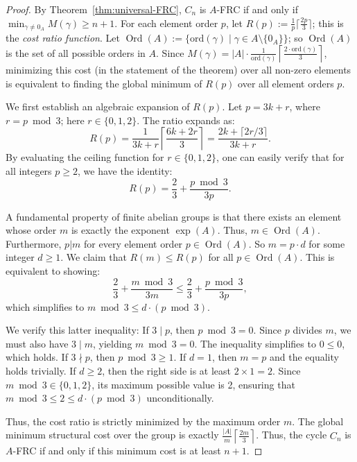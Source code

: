 \documentclass[a4paper,12pt]{article}
\theoremstyle{plain}
\theoremstyle{definition}
\renewcommand\le\leqslant
\renewcommand\ge\geqslant
\newcommand\ord{\textrm{ord}}
\begin{document}
\begin{proof}
By Theorem~\ref{thm:universal-FRC}, $C_n$ is $A$-FRC if and only if $\min_{\gamma \neq 0_A} M(\gamma) \ge n+1$. 
For each element order $p$, let $R(p):= \frac{1}{p}\lceil \frac{2p}{3} \rceil$; this is the
\emph{cost ratio function}.
Let $\operatorname{Ord}(A) := \{ \ord(\gamma) \mid \gamma \in A \setminus \{0_A\} \}$; so $\operatorname{Ord}(A)$ is the set of all possible orders in $A$.
Since $M(\gamma) = |A| \cdot \frac{1}{\ord(\gamma)}\left\lceil \frac{2\cdot \ord(\gamma)}{3} \right\rceil$, minimizing this cost (in the statement of the theorem) over all non-zero elements is equivalent to finding the global minimum of $R(p)$
over all element orders $p$. 

We first establish an algebraic expansion of $R(p)$. Let $p = 3k + r$, where $r = p \bmod 3$; here $r \in \{0, 1, 2\}$. 
The ratio expands as:
\[ R(p) = \frac{1}{3k+r} \left\lceil \frac{6k+2r}{3} \right\rceil = \frac{2k + \lceil 2r/3 \rceil}{3k+r}. \]
By evaluating the ceiling function for $r \in \{0, 1, 2\}$, one can easily verify that for all integers $p \ge 2$, we have the identity:
\[ R(p) = \frac{2}{3} + \frac{p \bmod 3}{3p}. \]

A fundamental property of finite abelian groups is that there exists an element whose order $m$ is exactly the exponent $\exp(A)$. 
Thus, $m \in \operatorname{Ord}(A)$. Furthermore, $p|m$ for every element order $p \in \operatorname{Ord}(A)$. So $m = p \cdot d$ for some integer $d \ge 1$. We claim that 
$R(m) \le R(p)$ for all $p \in \operatorname{Ord}(A)$. 
%
This is equivalent to showing:
\[ \frac{2}{3} + \frac{m \bmod 3}{3m} \le \frac{2}{3} + \frac{p \bmod 3}{3p},
\]
which simplifies to
$m \bmod 3 \le d \cdot (p \bmod 3)$.

We verify this latter inequality:
If $3 \mid p$, then $p \bmod 3 = 0$. Since $p$ divides $m$, we must also have $3 \mid m$, yielding $m \bmod 3 = 0$. The inequality simplifies to $0 \le 0$, which holds.
If $3 \nmid p$, then $p \bmod 3 \ge 1$. If $d = 1$, then $m = p$ and the equality holds trivially. If $d \ge 2$, then the right side is at least $2 \times 1 = 2$. Since $m \bmod 3 \in \{0, 1, 2\}$, its maximum possible value is 2, ensuring that $m \bmod 3 \le 2 \le d \cdot (p \bmod 3)$ unconditionally.

Thus, the cost ratio is strictly minimized by the maximum order $m$. The global minimum structural cost over the group is exactly $ \frac{|A|}{m} \left\lceil \frac{2m}{3} \right\rceil$. 
Thus, the cycle $C_n$ is $A$-FRC if and only if this minimum cost is at least $n+1$. 
\end{proof}
\end{document}
